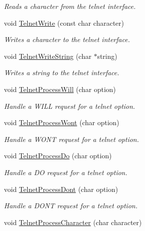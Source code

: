 \begin{DoxyCompactItemize}
\begin{DoxyCompactList}\small\item\em Reads a character from the telnet interface. \end{DoxyCompactList}\item 
void \hyperlink{group__telnet__server_gaa2f418e9d287a2863fe1198e3c75f4ad}{Telnet\-Write} (const char character)
\begin{DoxyCompactList}\small\item\em Writes a character to the telnet interface. \end{DoxyCompactList}\item 
void \hyperlink{group__telnet__server_ga579198334cf97874ecc89e3b29351066}{Telnet\-Write\-String} (char $\ast$string)
\begin{DoxyCompactList}\small\item\em Writes a string to the telnet interface. \end{DoxyCompactList}\item 
void \hyperlink{group__telnet__server_ga8779bc1d2c7943063104c8624a877d8b}{Telnet\-Process\-Will} (char option)
\begin{DoxyCompactList}\small\item\em Handle a W\-I\-L\-L request for a telnet option. \end{DoxyCompactList}\item 
void \hyperlink{group__telnet__server_gac84ea97f4be2d0b62498cca6297d0ab7}{Telnet\-Process\-Wont} (char option)
\begin{DoxyCompactList}\small\item\em Handle a W\-O\-N\-T request for a telnet option. \end{DoxyCompactList}\item 
void \hyperlink{group__telnet__server_gabdf9478794e09f61ab850c78147a7c6f}{Telnet\-Process\-Do} (char option)
\begin{DoxyCompactList}\small\item\em Handle a D\-O request for a telnet option. \end{DoxyCompactList}\item 
void \hyperlink{group__telnet__server_gaf2500a4ad4bcbfd6ac4367f298e42f10}{Telnet\-Process\-Dont} (char option)
\begin{DoxyCompactList}\small\item\em Handle a D\-O\-N\-T request for a telnet option. \end{DoxyCompactList}\item 
\hypertarget{group__telnet__server_ga348f2b04116a013b6eabfa72c926a25f}{void \hyperlink{group__telnet__server_ga348f2b04116a013b6eabfa72c926a25f}{Telnet\-Process\-Character} (char character)}\label{group__telnet__server_ga348f2b04116a013b6eabfa72c926a25f}


\end{DoxyCompactItemize}
